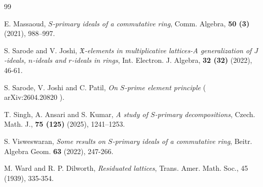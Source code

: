 \documentclass[10pt,twoside,a4]{amsart}
\numberwithin{equation}{section}
\theoremstyle{plain}
\theoremstyle{definition}
\begin{document}
\begin{thebibliography}{99}
		
		
		
		
		 E. Massaoud, {\it $S$-primary ideals of a commutative ring}, Comm. Algebra, {\bf 50 (3)} (2021), 988–997. 
		
		
		
		 S. Sarode and V. Joshi, {\it $\mathfrak {X} $-elements in multiplicative lattices-A generalization of $ J $-ideals, $ n $-ideals and $ r $-ideals in rings}, Int. Electron. J. Algebra, {\bf 32 (32)} (2022), 46-61.
		
		 S. Sarode, V. Joshi and C. Patil, {\it On $S$-prime element principle} (	arXiv:2604.20820 ).
		
		 T. Singh, A. Ansari and S. Kumar, {\it A study of $S$-primary decompositions}, Czech. Math. J., {\bf 75 (125)} (2025), 1241–1253.
		
		
		 S. Visweswaran, {\it Some results on $S$-primary ideals of a commutative ring}, Beitr. Algebra Geom. {\bf 63} (2022), 247-266.
		
		
		
		 M. Ward and R. P. Dilworth, {\it Residuated lattices}, Trans. Amer. Math. Soc.,  45 (1939), 335-354.	
\end{thebibliography}

	
\end{document}

